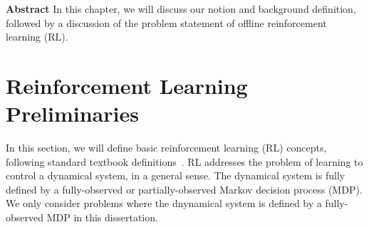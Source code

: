 \documentclass[../thesis.tex]{subfiles}
\begin{document}

% 

% 
% 
% 
% 
% 
% 


\vspace{-0.4cm}
\begin{AIbox}{\large{\textbf{Abstract}}}
\vspace{4mm}
In this chapter, we will discuss our notion and background definition, followed by a discussion of the problem statement of offline reinforcement learning (RL).   
\vspace{2mm}
\end{AIbox}


\section{Reinforcement Learning Preliminaries}
\label{sec:rl_prelims}

In this section, we will define basic reinforcement learning (RL) concepts, following standard textbook definitions~\citep{suttonrlbook}. RL addresses the problem of learning to control a dynamical system, in a general sense. The dynamical system is fully defined by a fully-observed or partially-observed Markov decision process (MDP). We only consider problems where the dnynamical system is defined by a fully-observed MDP in this dissertation. 
\end{document}
